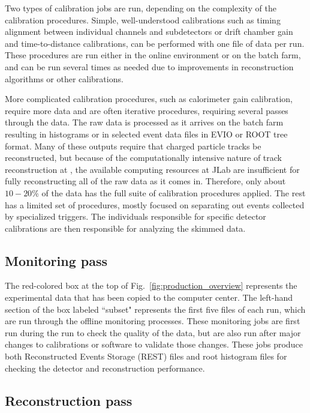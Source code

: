 Two types of calibration jobs are run, depending on the complexity of the calibration procedures.  Simple, well-understood calibrations such as timing alignment between individual channels and subdetectors or drift chamber gain and time-to-distance calibrations, can be performed with one file of data per run.  These procedures are run either in the online environment or on the batch farm, and can be run several times as needed due to improvements in reconstruction algorithms or other calibrations.

More complicated calibration procedures, such as calorimeter gain calibration, require more data and are often iterative procedures, requiring several passes through the data.  The raw data is processed as it arrives on the batch farm resulting in histograms or in selected event data files in EVIO or ROOT tree format.  Many of these outputs require that charged particle tracks be reconstructed, but because of the computationally intensive nature of track reconstruction at \GX, the available computing resources at JLab are insufficient for fully reconstructing all of the raw data as it comes in.  Therefore, only about $10-20$\% of the data has the full suite of calibration procedures applied.  The rest has a limited set of procedures, mostly focused on separating out events collected by specialized triggers. 
The individuals responsible for specific detector calibrations are then responsible for analyzing the skimmed data.

\subsection{Monitoring pass \label{sec:recmonitoring}}

The red-colored box at the top of Fig.~\ref{fig:production_overview} represents the experimental data that has been copied to the computer center. The left-hand section of the box labeled ``subset" represents the first five files of each run, which are run through the offline monitoring processes. These monitoring jobs are first run during the run to check the quality of the data, but are also run after major changes to calibrations or software to validate those changes. These jobs produce both Reconstructed Events Storage (REST) files and root histogram files for checking the detector and reconstruction performance.

\subsection{Reconstruction pass \label{sec:recreconstruction}}

